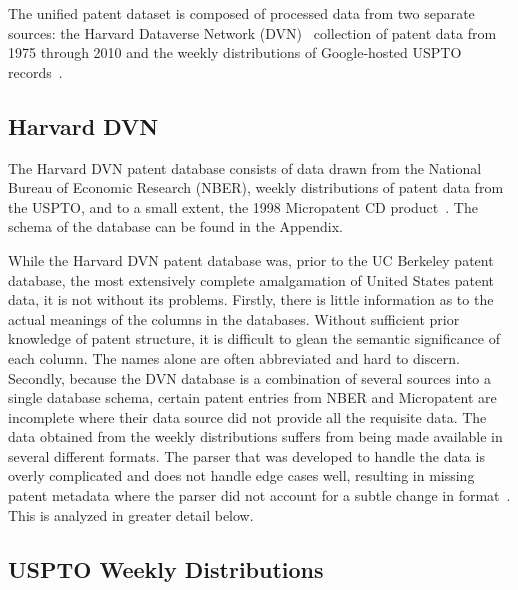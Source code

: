The unified patent dataset is composed of processed data from two separate sources: the Harvard Dataverse Network (DVN)~\cite{disambiguation} collection of patent data from 1975 through 2010 and the weekly distributions of Google-hosted USPTO records~\cite{googlefiles}.

\subsection{Harvard DVN}

The Harvard DVN patent database consists of data drawn from the National Bureau of Economic Research (NBER), weekly distributions of patent data from the USPTO, and to a small extent, the 1998 Micropatent CD product~\cite{micropatent}. The schema of the database can be found in the Appendix.

While the Harvard DVN patent database was, prior to the UC Berkeley patent database, the most extensively complete amalgamation of United States patent data, it is not without its problems. Firstly, there is little information as to the actual meanings of the columns in the databases. Without sufficient prior knowledge of patent structure, it is difficult to glean the semantic significance of each column. The names alone are often abbreviated and hard to discern. Secondly, because the DVN database is a combination of several sources into a single database schema, certain patent entries from NBER and Micropatent are incomplete where their data source did not provide all the requisite data. The data obtained from  the weekly distributions suffers from being made available in several different formats. The parser that was developed to handle the data is overly complicated and does not handle edge cases well, resulting in missing patent metadata where the parser did not account for a subtle change in format~\cite{oldparser}. This is analyzed in greater detail below.

\subsection{USPTO Weekly Distributions}

